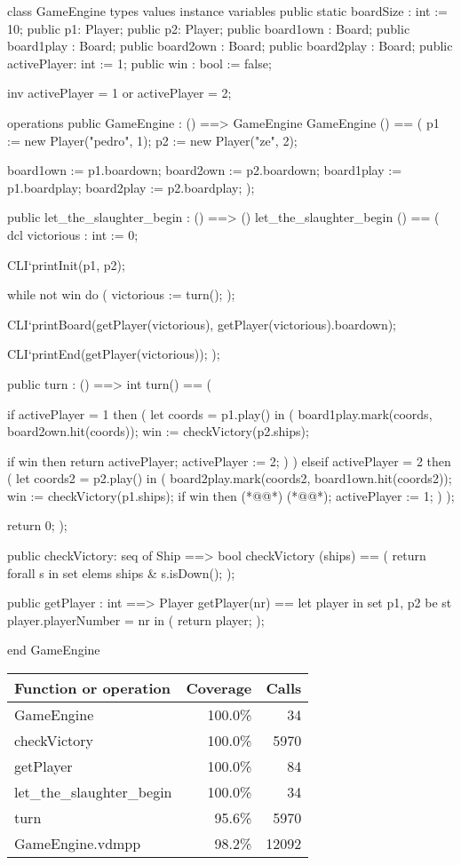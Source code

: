 \begin{vdm_al}
class GameEngine
 types
 values
 instance variables
  public static boardSize : int := 10;
  public p1: Player;
  public p2: Player;
  public board1own : Board;
  public board1play : Board;
  public board2own : Board;
  public board2play : Board;
  public activePlayer: int := 1;
  public win : bool := false;
  
  inv activePlayer = 1 or activePlayer = 2;
  
 operations
  public GameEngine : () ==> GameEngine
   GameEngine () ==
   (
    p1 := new Player("pedro", 1);
    p2 := new Player("ze", 2);
    
    board1own := p1.boardown;
    board2own := p2.boardown;
    board1play := p1.boardplay;
    board2play := p2.boardplay;
   );

  public let_the_slaughter_begin : () ==> ()
   let_the_slaughter_begin () ==
   (
    dcl victorious : int := 0;
    
    CLI`printInit(p1, p2);
    
    while not win do
    (
     victorious := turn();
    );
    
    CLI`printBoard(getPlayer(victorious), getPlayer(victorious).boardown);
    
    CLI`printEnd(getPlayer(victorious));
   );

  public turn : () ==> int
   turn() == (
   
    if activePlayer = 1 then (
     let coords = p1.play() in
     (
      board1play.mark(coords, board2own.hit(coords));
      win := checkVictory(p2.ships);
      
      if win then return activePlayer;
      activePlayer := 2;
     )
    )
    elseif activePlayer = 2 then (
     let coords2 = p2.play() in
     (
      board2play.mark(coords2, board1own.hit(coords2));
      win := checkVictory(p1.ships);
      if win then (*@@*) (*@@*);
      activePlayer := 1;
     )
    );
    
    return 0;
   );
  
  public checkVictory: seq of Ship ==> bool
   checkVictory (ships) ==
   (
    return forall s in set elems ships & s.isDown(); 
   );
   
  public getPlayer : int ==> Player
   getPlayer(nr) ==
    let player in set {p1, p2} be st player.playerNumber = nr in (
      return player;
    );


end GameEngine
\end{vdm_al}
\bigskip
\begin{longtable}{|l|r|r|}
\hline
Function or operation & Coverage & Calls \\
\hline
\hline
GameEngine & 100.0\% & 34 \\
\hline
checkVictory & 100.0\% & 5970 \\
\hline
getPlayer & 100.0\% & 84 \\
\hline
let\_the\_slaughter\_begin & 100.0\% & 34 \\
\hline
turn & 95.6\% & 5970 \\
\hline
\hline
GameEngine.vdmpp & 98.2\% & 12092 \\
\hline
\end{longtable}


